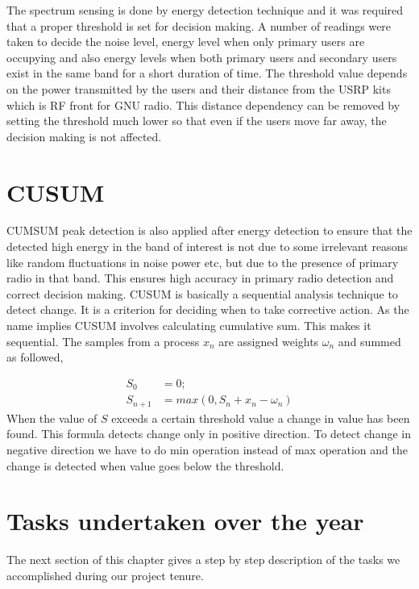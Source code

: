 The spectrum sensing is done by energy detection technique and it was required 
that a proper threshold is set for decision making. A number of readings were 
taken to decide the noise level, energy level when only primary users are 
occupying and also energy levels when both primary users and secondary users 
exist in the same band for a short duration of time. The threshold value 
depends on the power transmitted by the users and their distance from the USRP 
kits which is RF front for GNU radio. This distance dependency can be removed by 
setting the threshold much lower so that even if the users move 
far away, the decision making is not affected.  





\section{CUSUM}
CUMSUM peak detection is also applied after energy detection to ensure that the
detected high energy in the band of interest is not due to some irrelevant 
reasons like random fluctuations in noise power etc, but due to the presence of 
primary radio in that band. This ensures high accuracy in primary radio 
detection and correct decision making.
CUSUM is basically a sequential analysis technique to detect change. 
It is a criterion for deciding when to take corrective action. As the name 
implies CUSUM involves calculating cumulative sum. This makes it sequential. 
The samples from a process $x_n$  are assigned weights $\omega_n$  and summed 
as followed,

\begin{align}
S_0 &= 0; \nonumber \\
S_{n+1} &= max(0, S_n + x_n - \omega_n) \nonumber
\end{align}
When the value of $S$ exceeds a certain threshold value a change in value has 
been found. This formula detects change only in positive direction. To detect 
change in negative direction we have to do min operation instead of max 
operation and the change  is detected when value goes below the threshold.







\section{Tasks undertaken over the year}
The next section of this chapter gives a step by step description of the tasks we 
accomplished during our project tenure. 

